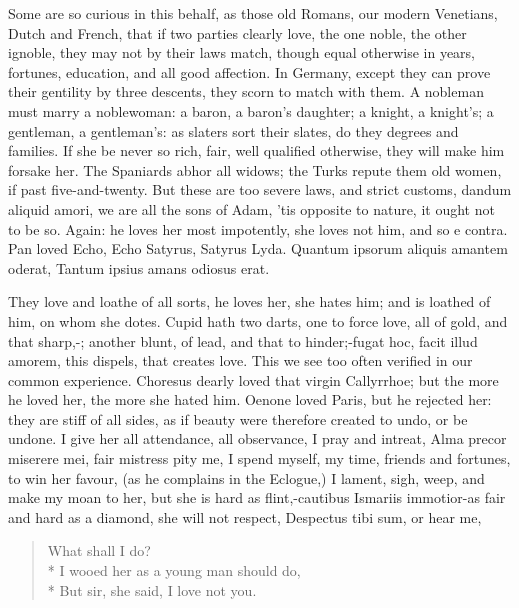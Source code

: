 {Some are so curious in this behalf, as those old Romans, our modern
Venetians, Dutch and French, that if two parties clearly love, the one
noble, the other ignoble, they may not by their laws match, though
equal otherwise in years, fortunes, education, and all good affection.
In Germany, except they can prove their gentility by three descents,
they scorn to match with them. A nobleman must marry a noblewoman: a
baron, a baron's daughter; a knight, a knight's; a gentleman, a
gentleman's: as slaters sort their slates, do they degrees and
families. If she be never so rich, fair, well qualified otherwise, they
will make him forsake her. The Spaniards abhor all widows; the Turks
repute them old women, if past five-and-twenty. But these are too
severe laws, and strict customs, dandum aliquid amori, we are all the
sons of Adam, 'tis opposite to nature, it ought not to be so. Again: he
loves her most impotently, she loves not him, and so e contra.
Pan loved Echo, Echo Satyrus, Satyrus Lyda.
Quantum ipsorum aliquis amantem oderat,
Tantum ipsius amans odiosus erat.

They love and loathe of all sorts, he loves her, she hates him; and is
loathed of him, on whom she dotes. Cupid hath two darts, one to force
love, all of gold, and that sharp,-;
another blunt, of lead, and that to hinder;-fugat hoc, facit illud
amorem, this dispels, that creates love. This we see too often verified
in our common experience. Choresus dearly loved that virgin
Callyrrhoe; but the more he loved her, the more she hated him. Oenone
loved Paris, but he rejected her: they are stiff of all sides, as if
beauty were therefore created to undo, or be undone. I give her all
attendance, all observance, I pray and intreat, Alma precor
miserere mei, fair mistress pity me, I spend myself, my time, friends
and fortunes, to win her favour, (as he complains in the
Eclogue,) I lament, sigh, weep, and make my moan to her, but she
is hard as flint,-cautibus Ismariis immotior-as fair and hard as a
diamond, she will not respect, Despectus tibi sum, or hear me,

\begin{verse}
What shall I do?\\*
I wooed her as a young man should do,\\*
But sir, she said, I love not you.
\end{verse}

}
